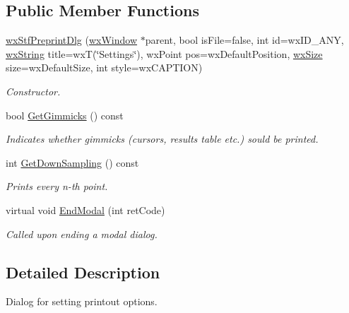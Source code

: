 \subsection*{Public Member Functions}
\begin{DoxyCompactItemize}
\item 
\hyperlink{classwxStfPreprintDlg_ad8b20d892a33caeeb3a253f0f7c18d9c}{wxStfPreprintDlg} (\hyperlink{classwxWindow}{wxWindow} $\ast$parent, bool isFile=false, int id=wxID\_\-ANY, \hyperlink{classwxString}{wxString} title=wxT(\char`\"{}Settings\char`\"{}), wxPoint pos=wxDefaultPosition, \hyperlink{classwxSize}{wxSize} size=wxDefaultSize, int style=wxCAPTION)
\begin{DoxyCompactList}\small\item\em Constructor. \item\end{DoxyCompactList}\item 
bool \hyperlink{classwxStfPreprintDlg_a435e128be18c9d953f54157201ae56d8}{GetGimmicks} () const 
\begin{DoxyCompactList}\small\item\em Indicates whether gimmicks (cursors, results table etc.) sould be printed. \item\end{DoxyCompactList}\item 
int \hyperlink{classwxStfPreprintDlg_ab57b3a5e7f47fd0723248e128c1a2de5}{GetDownSampling} () const 
\begin{DoxyCompactList}\small\item\em Prints every n-\/th point. \item\end{DoxyCompactList}\item 
virtual void \hyperlink{classwxStfPreprintDlg_a328f01c4d1ffa85f6cf29d49744a4b14}{EndModal} (int retCode)
\begin{DoxyCompactList}\small\item\em Called upon ending a modal dialog. \item\end{DoxyCompactList}\end{DoxyCompactItemize}


\subsection{Detailed Description}
Dialog for setting printout options. 

